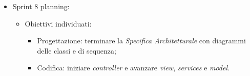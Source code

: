\begin{itemize}
  \item Sprint 8 planning:
        \begin{itemize}
          \item Obiettivi individuati:
                \begin{itemize}
                  \item Progettazione: terminare la \textit{Specifica Architetturale} con diagrammi delle classi e di sequenza;
                  \item Codifica: iniziare \textit{controller} e avanzare \textit{view}, \textit{services} e \textit{model}.
                \end{itemize}
        \end{itemize}
\end{itemize}
